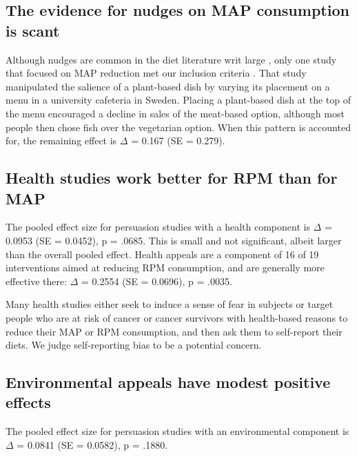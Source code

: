 \documentclass[sn-nature,pdflatex]{sn-jnl}
\begin{document}
\subsection{The evidence for nudges on MAP consumption is
scant}\label{the-evidence-for-nudges-on-map-consumption-is-scant}

Although nudges are common in the diet literature writ large
\citep{olafsson2024, cadario2020, szaszi2018}, only one study that
focused on MAP reduction met our inclusion criteria
\citep{andersson2021}. That study manipulated the salience of a
plant-based dish by varying its placement on a menu in a university
cafeteria in Sweden. Placing a plant-based dish at the top of the menu
encouraged a decline in sales of the meat-based option, although most
people then chose fish over the vegetarian option. When this pattern is
accounted for, the remaining effect is \(\Delta\) = 0.167 (SE = 0.279).

\subsection{Health studies work better for RPM than for
MAP}\label{health-studies-work-better-for-rpm-than-for-map}

The pooled effect size for persuasion studies with a health component is
\(\Delta\) = 0.0953 (SE = 0.0452), p = .0685. This is small and not
significant, albeit larger than the overall pooled effect. Health
appeals are a component of 16 of 19 interventions aimed at reducing RPM
consumption, and are generally more effective there: \(\Delta\) = 0.2554
(SE = 0.0696), p = .0035.

Many health studies either seek to induce a sense of fear in subjects
\citep[@][]{berndsen2005} or target people who are at risk of cancer
\citep{hatami2018} or cancer survivors \citep{james2005, lee2018} with
health-based reasons to reduce their MAP or RPM consumption, and then
ask them to self-report their diets. We judge self-reporting bias to be
a potential concern.

\subsection{Environmental appeals have modest positive
effects}\label{environmental-appeals-have-modest-positive-effects}

The pooled effect size for persuasion studies with an environmental
component is \(\Delta\) = 0.0841 (SE = 0.0582), p = .1880.
\end{document}
